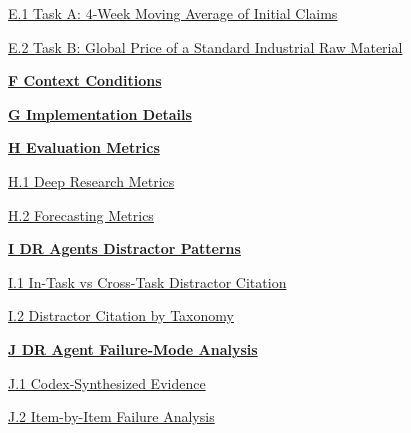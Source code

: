 \documentclass[]{servicenow}
\begin{document}
\hspace{0.5cm}\hyperref[appx:distractor-task-a]{E.1 Task A: 4-Week Moving Average of Initial Claims}
\dotfill \hyperref[appx:distractor-task-a]{\pageref{appx:distractor-task-a}}

\hspace{0.5cm}\hyperref[appx:distractor-task-b]{E.2 Task B: Global Price of a Standard Industrial Raw Material}
\dotfill \hyperref[appx:distractor-task-b]{\pageref{appx:distractor-task-b}}

\textbf{\hyperref[appx:context_modes]{F Context Conditions}}
\dotfill \hyperref[appx:context_modes]{\pageref{appx:context_modes}}

\textbf{\hyperref[app:experimental-setup]{G Implementation Details}}
\dotfill \hyperref[app:experimental-setup]{\pageref{app:experimental-setup}}

\textbf{\hyperref[app:metrics]{H Evaluation Metrics}}
\dotfill \hyperref[app:metrics]{\pageref{app:metrics}}

\hspace{0.5cm}\hyperref[app:metrics-dr]{H.1 Deep Research Metrics}
\dotfill \hyperref[app:metrics-dr]{\pageref{app:metrics-dr}}

\hspace{0.5cm}\hyperref[app:metrics-forecast]{H.2 Forecasting Metrics}
\dotfill \hyperref[app:metrics-forecast]{\pageref{app:metrics-forecast}}

\textbf{\hyperref[app:distractor_citation]{I DR Agents Distractor Patterns}}
\dotfill \hyperref[app:distractor_citation]{\pageref{app:distractor_citation}}

\hspace{0.5cm}\hyperref[subsec:dr-in-vs-cross]{I.1 In-Task vs Cross-Task Distractor Citation}
\dotfill \hyperref[subsec:dr-in-vs-cross]{\pageref{subsec:dr-in-vs-cross}}

\hspace{0.5cm}\hyperref[subsec:dr-subtypes]{I.2 Distractor Citation by Taxonomy}
\dotfill \hyperref[subsec:dr-subtypes]{\pageref{subsec:dr-subtypes}}

\textbf{\hyperref[appx:dr_fail]{J DR Agent Failure-Mode Analysis}}
\dotfill \hyperref[appx:dr_fail]{\pageref{appx:dr_fail}}

\hspace{0.5cm}\hyperref[appx:task216:synth]{J.1 Codex-Synthesized Evidence}
\dotfill \hyperref[appx:task216:synth]{\pageref{appx:task216:synth}}

\hspace{0.5cm}\hyperref[appx:task216:per_item]{J.2 Item-by-Item Failure Analysis}
\dotfill \hyperref[appx:task216:per_item]{\pageref{appx:task216:per_item}}
\end{document}
